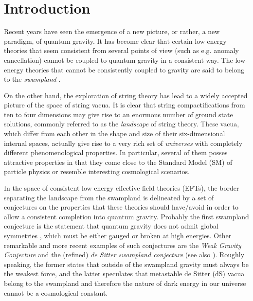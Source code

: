 \documentclass[11pt,a4paper]{article}
\begin{document}




	
\fontsize{11}{14}\selectfont

\newpage
\setcounter{page}{1}
	\pagestyle{plain}
\tableofcontents


\section{Introduction}


Recent years have seen the emergence of a new picture, or rather, a new paradigm, of quantum gravity. It has become clear that certain low energy theories that seem consistent from several points of view (such as e.g. anomaly cancellation) cannot be coupled to quantum gravity in a consistent way. 
The low-energy theories  that cannot be consistently coupled to gravity are said to belong to the \textit{swampland} \cite{swampland}.

On the other hand, the exploration of string theory has lead to a widely accepted picture of the space of string vacua. It is clear that string compactifications from ten to four dimensions may give rise to an enormous number of ground state solutions, commonly referred to as the \textit{landscape} of string theory. These vacua, which differ from each other in the shape and size of their six-dimensional internal spaces, actually give rise to a very rich set of \textit{universes} with completely different phenomenological properties. In particular, several of them  posses attractive  properties in that they come close to the Standard Model (SM) of particle physics or resemble interesting cosmological scenarios. 


In the space of consistent low energy effective field theories (EFTs), the border separating the landscape from the swampland is delineated by a set of conjectures on the properties that these theories should have/avoid in order to allow a consistent completion into quantum gravity. Probably the first swampland conjecture is the statement that quantum gravity does not admit global symmetries \cite{Banks:2010zn}, which must be either gauged or broken at high energies. Other remarkable and more recent examples of such conjectures are the \textit{Weak Gravity Conjecture} \cite{ArkaniHamed:2006dz} and the (refined) \textit{de Sitter swampland conjecture} \cite{dS1,dS2,dS3} (see also \cite{Danielsson:2018ztv,Andriot:2018wzk}). Roughly speaking, the former states that outside of the swampland gravity must always be the weakest force, and the latter speculates that metastable de Sitter (dS) vacua belong to the swampland and therefore the nature of dark energy in our universe cannot be a cosmological constant.
\end{document}
